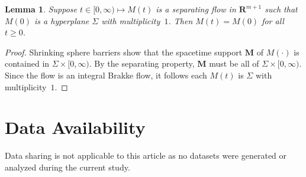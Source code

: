 \documentclass{amsart}
\newcommand{\MMM}{\mathbf M}
\newcommand{\RR}{\mathbf{R}}  %
\newcommand{\spt}{\operatorname{spt}}
\newtheorem{theorem}    {Theorem}   %
\newtheorem{lemma}      [theorem]       {Lemma}
\theoremstyle{definition}
\theoremstyle{definition}
\begin{document}
\begin{lemma}\label{separating-lemma}
Suppose $t\in [0,\infty)\mapsto M(t)$ is a separating flow in $\RR^{m+1}$ such that $M(0)$ is a hyperplane
$\Sigma$ with multiplicity~$1$.  Then $M(t)=M(0)$ for all $t\ge 0$.
\end{lemma}

\begin{proof}
Shrinking sphere barriers show that the spacetime support $\MMM$ of $M(\cdot)$ is
contained in $\Sigma\times [0,\infty)$.    By the separating property, $\MMM$ must
be all of $\Sigma\times[0,\infty)$.   Since the flow is an integral Brakke flow, it follows
each $M(t)$ is $\Sigma$ with multiplicity~$1$.
\end{proof}

\section*{Data Availability}

Data sharing is not applicable to this article as no datasets were generated or analyzed during the current study.

\nocite{pedrosa-ritore}
\nocite{hoffman-wei}
\newcommand{\hide}[1]{}
\end{document}
